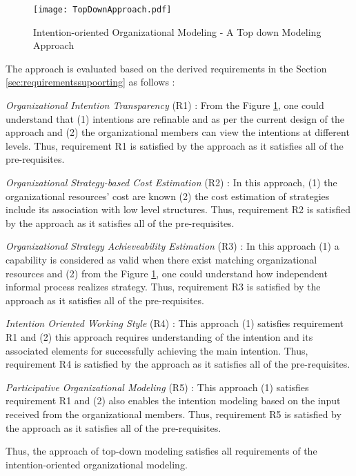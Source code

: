 \begin{figure}
	\centering
	\texttt{[image: TopDownApproach.pdf]}
	\caption{Intention-oriented Organizational Modeling - A Top down Modeling Approach}
	\label{fig:topdownapproach}
\end{figure}

The approach is evaluated based on the derived requirements in the Section \ref{sec:requirementssupoorting} as follows :

\textit{Organizational Intention Transparency} (R1) : From the Figure \ref{fig:topdownapproach}, one could understand that (1) intentions are refinable and as per the current design of the approach and (2) the organizational members can view the intentions at different levels. Thus, requirement R1 is satisfied by the approach as it satisfies all of the pre-requisites. 

\textit{Organizational Strategy-based Cost Estimation} (R2) :  In this approach, (1) the organizational resources' cost are known (2) the cost estimation of strategies include its association with low level structures. Thus, requirement R2 is satisfied by the approach as it satisfies all of the pre-requisites. 

\textit{Organizational Strategy Achieveability Estimation} (R3) :  In this approach (1) a capability is considered as valid when there exist matching organizational resources and (2) from the Figure \ref{fig:topdownapproach}, one could understand how independent informal process realizes strategy. Thus, requirement R3 is satisfied by the approach as it satisfies all of the pre-requisites.

\textit{Intention Oriented Working Style} (R4) : This approach (1) satisfies requirement R1 and (2) this approach requires understanding of the intention and its associated elements for successfully achieving the main intention. Thus, requirement R4 is satisfied by the approach as it satisfies all of the pre-requisites.

\textit{Participative Organizational Modeling} (R5) : This approach (1) satisfies requirement R1 and  (2) also enables the intention modeling based on the input received from the organizational members. Thus, requirement R5 is satisfied by the approach as it satisfies all of the pre-requisites. 

Thus, the approach of top-down modeling satisfies all requirements of the intention-oriented organizational modeling.

